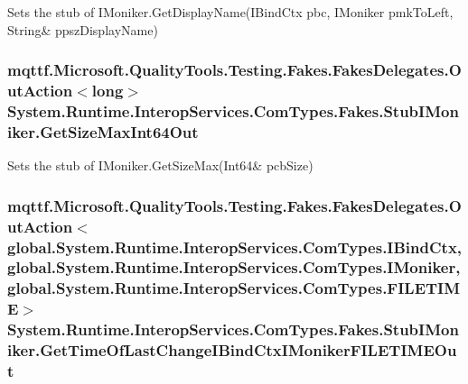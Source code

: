 Sets the stub of I\-Moniker.\-Get\-Display\-Name(I\-Bind\-Ctx pbc, I\-Moniker pmk\-To\-Left, String\& ppsz\-Display\-Name)

\hypertarget{class_system_1_1_runtime_1_1_interop_services_1_1_com_types_1_1_fakes_1_1_stub_i_moniker_abcc647ec6bd16035208ec9224300d4b1}{
\subsubsection[{Get\-Size\-Max\-Int64\-Out}]{\setlength{\rightskip}{0pt plus 5cm}mqttf.\-Microsoft.\-Quality\-Tools.\-Testing.\-Fakes.\-Fakes\-Delegates.\-Out\-Action$<$long$>$ System.\-Runtime.\-Interop\-Services.\-Com\-Types.\-Fakes.\-Stub\-I\-Moniker.\-Get\-Size\-Max\-Int64\-Out}}\label{class_system_1_1_runtime_1_1_interop_services_1_1_com_types_1_1_fakes_1_1_stub_i_moniker_abcc647ec6bd16035208ec9224300d4b1}


Sets the stub of I\-Moniker.\-Get\-Size\-Max(Int64\& pcb\-Size)

\hypertarget{class_system_1_1_runtime_1_1_interop_services_1_1_com_types_1_1_fakes_1_1_stub_i_moniker_a5939057db6af8cb049d45dbf826a60a5}{
\subsubsection[{Get\-Time\-Of\-Last\-Change\-I\-Bind\-Ctx\-I\-Moniker\-F\-I\-L\-E\-T\-I\-M\-E\-Out}]{\setlength{\rightskip}{0pt plus 5cm}mqttf.\-Microsoft.\-Quality\-Tools.\-Testing.\-Fakes.\-Fakes\-Delegates.\-Out\-Action$<$global.\-System.\-Runtime.\-Interop\-Services.\-Com\-Types.\-I\-Bind\-Ctx, global.\-System.\-Runtime.\-Interop\-Services.\-Com\-Types.\-I\-Moniker, global.\-System.\-Runtime.\-Interop\-Services.\-Com\-Types.\-F\-I\-L\-E\-T\-I\-M\-E$>$ System.\-Runtime.\-Interop\-Services.\-Com\-Types.\-Fakes.\-Stub\-I\-Moniker.\-Get\-Time\-Of\-Last\-Change\-I\-Bind\-Ctx\-I\-Moniker\-F\-I\-L\-E\-T\-I\-M\-E\-Out}}\label{class_system_1_1_runtime_1_1_interop_services_1_1_com_types_1_1_fakes_1_1_stub_i_moniker_a5939057db6af8cb049d45dbf826a60a5}


